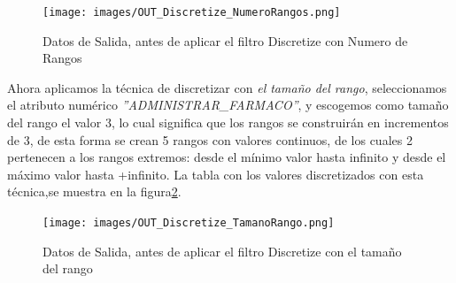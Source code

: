 \begin{figure}[h]
\centering
\texttt{[image: images/OUT\_Discretize\_NumeroRangos.png]}
\caption{Datos de Salida, antes de aplicar el filtro Discretize con Numero de Rangos}
\label{figDiscretizeNumeroRangos}
\end{figure}  

Ahora aplicamos la t\'ecnica de discretizar con \textit{el tama\~no del rango}, seleccionamos el atributo num\'erico \textit{''ADMINISTRAR\_FARMACO''}, y escogemos como tama\~no del rango el valor 3, lo cual significa que los rangos se construir\'an en incrementos  de 3, de esta forma se  crean 5 rangos con valores continuos, de los cuales 2 pertenecen a los rangos extremos: desde el m\'inimo valor hasta \-infinito y desde el m\'aximo valor hasta +infinito. 
La tabla con los valores discretizados con esta t\'ecnica,se muestra en la figura\ref{DiscretizeTamanoRango}. \\

\begin{figure}[h]
\centering
\texttt{[image: images/OUT\_Discretize\_TamanoRango.png]}
\caption{Datos de Salida, antes de aplicar el filtro Discretize con el tama\~no del rango}
\label{DiscretizeTamanoRango}
\end{figure}
